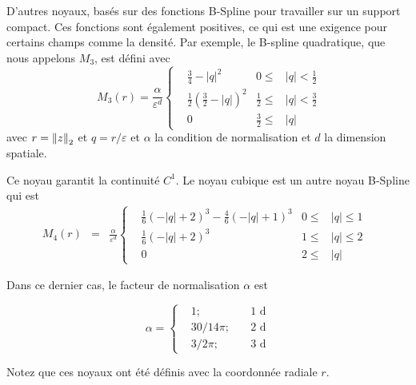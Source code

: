D'autres noyaux, basés sur des fonctions B-Spline pour travailler sur un support compact. Ces fonctions sont également positives, ce qui est une exigence pour certains champs comme la densité. Par exemple, le B-spline quadratique, que nous appelons $M_3$, est défini avec
\begin{equation*}~\label{quadratic_kernel}
    M_3(r) = \frac{\alpha}{\varepsilon^d}\left\{ \begin{aligned}
         & \frac{3}{4} - |q|^2                            & 0 \leq           & |q| < \frac{1}{2} \\
         & \frac{1}{2} {\left(\frac{3}{2} - |q|\right)}^2 & \frac{1}{2} \leq & |q| < \frac{3}{2} \\
         & 0                                              & \frac{3}{2} \leq & |q|
    \end{aligned}
    \right.
\end{equation*}avec $r = \left\lVert z \right\rVert_2 $ et $q = r / \varepsilon$ et $\alpha$ la condition de normalisation et $d$ la dimension spatiale.

Ce noyau garantit la continuité $C^1$.
Le noyau cubique est un autre noyau B-Spline qui est
\begin{eqnarray*}~\label{cubic_kernel}
    M_4(r) &=&  \frac{\alpha}{\varepsilon^d} \left\{ \begin{aligned}
         & \frac{1}{6}{(-|q|+2)}^3 - \frac{4}{6}{(-|q|+1)}^3 & 0 \leq      & |q| \leq  1 & \\
         & \frac{1}{6}{(- |q|+2)}^3                          & 1      \leq & |q| \leq 2  & \\
         & 0                                                 & 2 \leq      & |q|
    \end{aligned}
    \right.
\end{eqnarray*}

Dans ce dernier cas, le facteur de normalisation $\alpha$ est

\begin{equation*}
    \alpha = \left\{ \begin{aligned}
         & 1;    \quad      & 1\text{ d} \\
         & 30/14 \pi; \quad & 2\text{ d} \\
         & 3/ 2\pi; \quad   & 3\text{ d}
    \end{aligned}
    \right.
\end{equation*}

Notez que ces noyaux ont été définis avec la coordonnée radiale $r$.

